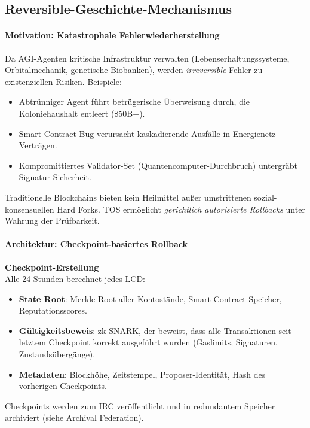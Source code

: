 \documentclass[11pt]{article}
\begin{document}
\subsection{Reversible-Geschichte-Mechanismus}

\paragraph{Motivation: Katastrophale Fehlerwiederherstellung}
Da AGI-Agenten kritische Infrastruktur verwalten (Lebenserhaltungssysteme, Orbitalmechanik, genetische Biobanken), werden \emph{irreversible} Fehler zu existenziellen Risiken. Beispiele:
\begin{itemize}[noitemsep]
  \item Abtrünniger Agent führt betrügerische Überweisung durch, die Koloniehaushalt entleert (\$50B+).
  \item Smart-Contract-Bug verursacht kaskadierende Ausfälle in Energienetz-Verträgen.
  \item Kompromittiertes Validator-Set (Quantencomputer-Durchbruch) untergräbt Signatur-Sicherheit.
\end{itemize}
Traditionelle Blockchains bieten kein Heilmittel außer umstrittenen sozial-konsensuellen Hard Forks. TOS ermöglicht \emph{gerichtlich autorisierte Rollbacks} unter Wahrung der Prüfbarkeit.

\paragraph{Architektur: Checkpoint-basiertes Rollback}
\textbf{Checkpoint-Erstellung}\\
Alle 24 Stunden berechnet jedes LCD:
\begin{itemize}[noitemsep]
  \item \textbf{State Root}: Merkle-Root aller Kontostände, Smart-Contract-Speicher, Reputationsscores.
  \item \textbf{Gültigkeitsbeweis}: zk-SNARK, der beweist, dass alle Transaktionen seit letztem Checkpoint korrekt ausgeführt wurden (Gaslimits, Signaturen, Zustandsübergänge).
  \item \textbf{Metadaten}: Blockhöhe, Zeitstempel, Proposer-Identität, Hash des vorherigen Checkpoints.
\end{itemize}
Checkpoints werden zum IRC veröffentlicht und in redundantem Speicher archiviert (siehe Archival Federation).
\end{document}
